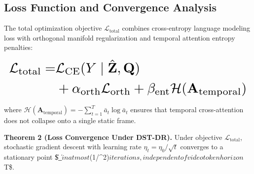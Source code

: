 \documentclass[10pt,journal,compsoc,twocolumn]{IEEEtran}
\begin{document}
\subsection{Loss Function and Convergence Analysis}


The total optimization objective $\mathcal{L}_{\text{total}}$ combines cross-entropy language modeling loss with orthogonal manifold regularization and temporal attention entropy penalties:

























\begin{equation}
\resizebox{\columnwidth}{!}{$\displaystyle
\begin{aligned}
\mathcal{L}_{\text{total}} = & \mathcal{L}_{\text{CE}}(Y \mid \hat{\mathbf{Z}}, \mathbf{Q}) \\
& + \alpha_{\text{orth}} \mathcal{L}_{\text{orth}} + \beta_{\text{ent}} \mathcal{H}(\mathbf{A}_{\text{temporal}})
\end{aligned}
$}
\end{equation}

























where $\mathcal{H}(\mathbf{A}_{\text{temporal}}) = -\sum_{t=1}^T \bar{a}_t \log \bar{a}_t$ ensures that temporal cross-attention does not collapse onto a single static frame.

\textbf{Theorem 2 (Loss Convergence Under DST-DR).} Under objective $\mathcal{L}_{\text{total}}$, stochastic gradient descent with learning rate $\eta_t = \eta_0 / \sqrt{t}$ converges to a stationary point \$\|\nabla {}\_{}\| \le \epsilon$ in at most $(1/\epsilon^2)$ iterations, independent of video token horizon $T\$.
\end{document}
